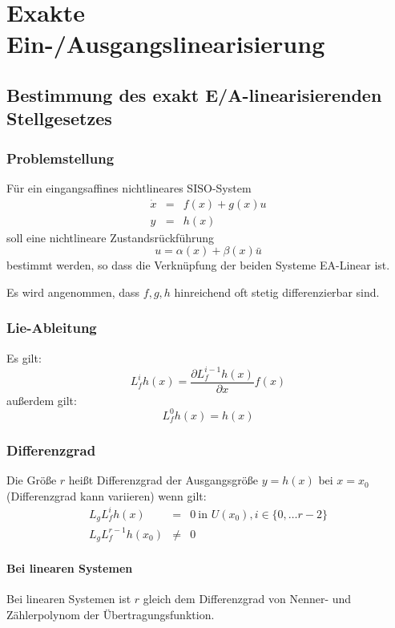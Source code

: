 \chapter{Exakte Ein-/Ausgangslinearisierung}
\section{Bestimmung des exakt E/A-linearisierenden Stellgesetzes}
\subsection{Problemstellung}
Für ein eingangsaffines nichtlineares SISO-System
\begin{eqnarray}
    \dot{x} &=& f(x) + g(x) u \\
    y &=& h(x)
\end{eqnarray}
soll eine nichtlineare Zustandsrückführung
\begin{equation}
    u = \alpha(x) + \beta(x) \bar{u}
\end{equation} 
bestimmt werden, so dass die Verknüpfung der beiden Systeme EA-Linear ist.

Es wird angenommen, dass $f, g, h$ hinreichend oft stetig differenzierbar sind.

\subsection{Lie-Ableitung}
Es gilt:
\begin{equation}
    L_f^i h(x) = \frac{\partial L_f^{i-1} h(x)}{\partial x} f(x)
\end{equation}
außerdem gilt:
\begin{equation}
    L_f^0 h(x) = h(x)
\end{equation}

\subsection{Differenzgrad}
Die Größe $r$ heißt Differenzgrad der Ausgangsgröße $y=h(x)$ bei $x=x_0$ (Differenzgrad
kann variieren) wenn gilt:
\begin{eqnarray}
    L_g L_f^i h(x) &=& 0\ \text{in } U(x_0), i \in \{0, \ldots r-2\} \\
    L_g L_f^{r-1} h(x_0) &\neq& 0
\end{eqnarray}

\subsubsection{Bei linearen Systemen}
Bei linearen Systemen ist $r$ gleich dem Differenzgrad von Nenner- und Zählerpolynom
der Übertragungsfunktion.


